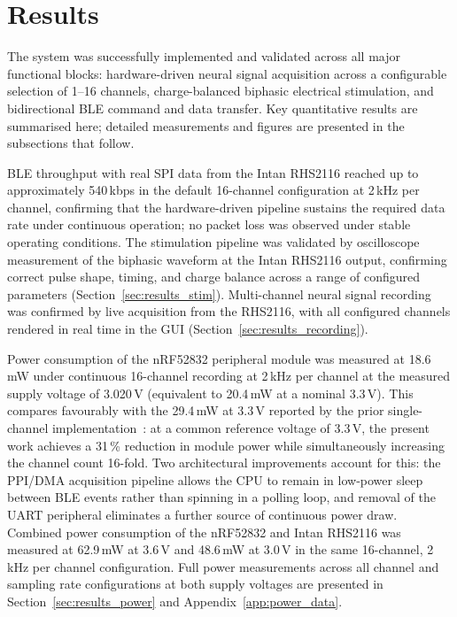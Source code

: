 \section{Results}
\label{sec:results}

The system was successfully implemented and validated across all major functional blocks:
hardware-driven neural signal acquisition across a configurable selection of 1--16 channels,
charge-balanced biphasic electrical stimulation, and bidirectional BLE command and data
transfer. Key quantitative results are summarised here; detailed measurements and figures
are presented in the subsections that follow.

BLE throughput with real SPI data from the Intan RHS2116 reached up to
approximately 540\,kbps in the default 16-channel configuration at 2\,kHz per channel,
confirming that the hardware-driven pipeline sustains the required data rate under
continuous operation; no packet loss was observed under stable operating conditions.
The stimulation pipeline was validated by oscilloscope
measurement of the biphasic waveform at the Intan RHS2116 output, confirming correct pulse
shape, timing, and charge balance across a range of configured parameters
(Section~\ref{sec:results_stim}). Multi-channel neural signal recording was confirmed by
live acquisition from the RHS2116, with all configured channels rendered in real time in
the GUI (Section~\ref{sec:results_recording}).

Power consumption of the nRF52832 peripheral module was measured at 18.6\,mW under
continuous 16-channel recording at 2\,kHz per channel at the measured supply voltage
of 3.020\,V (equivalent to 20.4\,mW at a nominal 3.3\,V). This compares favourably
with the 29.4\,mW at 3.3\,V reported by the prior single-channel
implementation~\cite{prior_impl}: at a common reference voltage of 3.3\,V, the present
work achieves a 31\,\% reduction in module power while simultaneously increasing the
channel count 16-fold. Two architectural improvements account for this: the PPI/DMA
acquisition pipeline allows the CPU to remain in low-power sleep between BLE events
rather than spinning in a polling loop, and removal of the UART peripheral eliminates
a further source of continuous power draw. Combined power consumption of the nRF52832 and Intan RHS2116 was measured at
62.9\,mW at 3.6\,V and 48.6\,mW at 3.0\,V in the same 16-channel, 2\,kHz per
channel configuration. Full power measurements across all channel and sampling
rate configurations at both supply voltages are presented in
Section~\ref{sec:results_power} and Appendix~\ref{app:power_data}.

